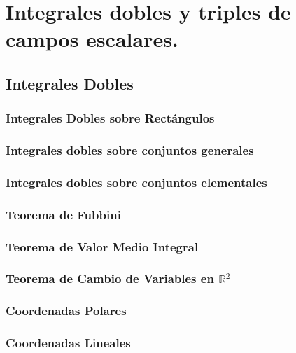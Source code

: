 \documentclass{report}
\begin{document}
  
    \chapter{Integrales dobles y triples de  campos escalares.}
     \section{Integrales Dobles} 
        \subsection{Integrales Dobles sobre Rectángulos}
         
           \subsection{Integrales dobles sobre conjuntos generales}
          
           \subsection{Integrales dobles sobre conjuntos elementales}
           
      \subsection{Teorema de Fubbini}
      
          \subsection{Teorema de Valor Medio Integral}
            
         \subsection{Teorema de Cambio de Variables en $\mathbb{R}^{2}$}
          
           \subsection{Coordenadas Polares}
            
            \subsection{Coordenadas Lineales}
            
\end{document}
